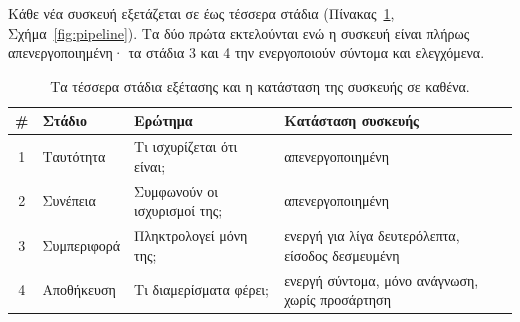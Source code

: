Κάθε νέα συσκευή εξετάζεται σε έως τέσσερα στάδια (Πίνακας~\ref{tab:stages},
Σχήμα~\ref{fig:pipeline}). Τα δύο πρώτα εκτελούνται ενώ η συσκευή είναι
πλήρως απενεργοποιημένη· τα στάδια 3 και 4 την ενεργοποιούν σύντομα και
ελεγχόμενα.

\begin{table}[htbp]
\centering
\caption{Τα τέσσερα στάδια εξέτασης και η κατάσταση της συσκευής σε καθένα.}
\label{tab:stages}
\begin{tabular}{@{}clp{4.2cm}p{4.4cm}@{}}
\toprule
\textbf{\#} & \textbf{Στάδιο} & \textbf{Ερώτημα} & \textbf{Κατάσταση συσκευής}\\
\midrule
1 & Ταυτότητα  & Τι ισχυρίζεται ότι είναι; & απενεργοποιημένη\\
2 & Συνέπεια   & Συμφωνούν οι ισχυρισμοί της; & απενεργοποιημένη\\
3 & Συμπεριφορά & Πληκτρολογεί μόνη της; & ενεργή για λίγα δευτερόλεπτα, είσοδος δεσμευμένη\\
4 & Αποθήκευση & Τι διαμερίσματα φέρει; & ενεργή σύντομα, μόνο ανάγνωση, χωρίς προσάρτηση\\
\bottomrule
\end{tabular}
\end{table}


